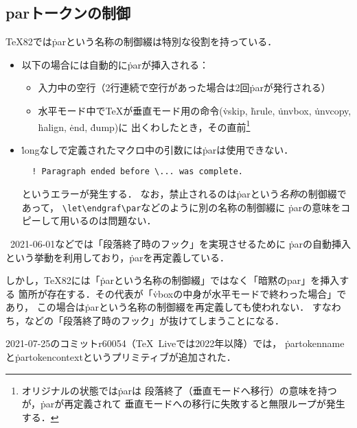 \documentclass[a4paper,11pt,nomag,dvipdfmx]{jsarticle}
\begin{document}
\subsection{parトークンの制御}
\TeX82では\.{par}という名称の制御綴は特別な役割を持っている．
\begin{itemize}
  \item 以下の場合には自動的に\.{par}が挿入される：
    \begin{itemize}
      \item 入力中の空行（2行連続で空行があった場合は2回\.{par}が発行される）
      \item 水平モード中で\TeX が垂直モード用の命令(\.{vskip}, \.{hrule},
        \.{unvbox}, \.{unvcopy}, \.{halign}, \.{end}, \.{dump})に
        出くわしたとき，その直前\footnote{オリジナルの状態では\.{par}は
        段落終了（垂直モードへ移行）の意味を持つが，\.{par}が再定義されて
        垂直モードへの移行に失敗すると無限ループが発生する．}
    \end{itemize}
 \item \.{long}なしで定義されたマクロ中の引数には\.{par}は使用できない．
\begin{verbatim}
  ! Paragraph ended before \... was complete.
\end{verbatim}
  というエラーが発生する．
  なお，禁止されるのは\.{par}という\emph{名称}の制御綴であって，
  \verb+\let\endgraf\par+などのように別の名称の制御綴に
  \.{par}の意味をコピーして用いるのは問題ない．
\end{itemize}

\LaTeXe~2021-06-01などでは「段落終了時のフック」を実現させるために
\.{par}の自動挿入という挙動を利用しており，\.{par}を再定義している．

しかし，\TeX82には「\.{par}という名称の制御綴」ではなく「暗黙のpar」を挿入する
箇所が存在する．その代表が「\.{vbox}の中身が水平モードで終わった場合」であり，
この場合は\.{par}という名称の制御綴を再定義しても使われない．
すなわち，\LaTeXe などの「段落終了時のフック」が抜けてしまうことになる．

2021-07-25のコミットr60054（\TeX~Liveでは2022年以降）では，
\.{partokenname}と\.{partokencontext}というプリミティブが追加された．
\end{document}
